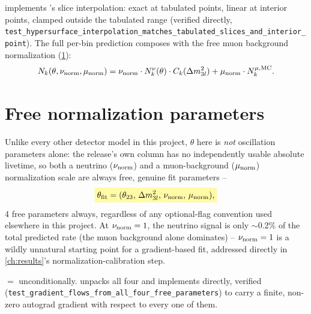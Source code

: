 \begin{implbox}
 implements
's slice interpolation: exact at tabulated
points, linear at interior points, clamped outside the tabulated range
(verified directly, \texttt{test\_hypersurface\_interpolation\_matches\_tabulated\_slices\_and\_interior\_point}).
The full per-bin prediction composes
 with the free muon
background normalization (\cref{sec:free-normalization-icecube}):
\begin{equation}
  N_k(\theta,\nu_{\rm norm},\mu_{\rm norm}) = \nu_{\rm norm}\cdot N_k^\nu(\theta)\cdot C_k(\Delta m^2_{3l})
    + \mu_{\rm norm}\cdot N_k^{\mu,{\rm MC}}.
  \label{eq:full-prediction}
\end{equation}
\end{implbox}

\section{Free normalization parameters}
\label{sec:free-normalization-icecube}

\begin{theorybox}
Unlike every other detector model in this project, $\theta$ here is
\emph{not} oscillation parameters alone: the release's own 
column has no independently usable absolute livetime, so both a neutrino
($\nu_{\rm norm}$) and a muon-background ($\mu_{\rm norm}$) normalization
scale are always free, genuine fit parameters --
\begin{equation}
  \keyresult{\theta_{\rm fit} = (\theta_{23},\,\Delta m^2_{3l},\,\nu_{\rm norm},\,\mu_{\rm norm}),}
\end{equation}
4 free parameters always, regardless of any optional-flag convention used
elsewhere in this project. At $\nu_{\rm norm}=1$, the neutrino signal is
only $\sim$0.2\% of the total predicted rate (the muon background alone
dominates) -- $\nu_{\rm norm}=1$ is a wildly unnatural starting point for a
gradient-based fit, addressed directly in \cref{ch:results}'s
normalization-calibration step.
\end{theorybox}

\begin{implbox}
 $=$  unconditionally.  unpacks
all four and implements  directly, verified
(\texttt{test\_gradient\_flows\_from\_all\_four\_free\_parameters}) to
carry a finite, non-zero autograd gradient with respect to every one of
them.
\end{implbox}
